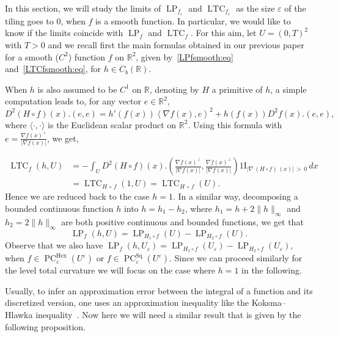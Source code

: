 \documentclass[AHL,Unicode,longabstracts,published]{cedram}
\newcommand{\R}{\mathbb{R}}
\newcommand{\ind}{{1\!\!\mathrm{I}}}
\newcommand{\eps}{\varepsilon}
\DeclareMathOperator{\LTC}{LTC}
\DeclareMathOperator{\LP}{LP}
\DeclareMathOperator{\PC}{PC}
\DeclareMathOperator{\Hex}{Hex}
\DeclareMathOperator{\Sq}{Sq}
\begin{document}
In this section, we will study the limits of $\LP_{f_\eps}$ and $\LTC_{f_\eps}$ as the size $\eps$ of the tiling goes to $0$, when $f$ is a smooth function. In particular, we would like to know if the limits coincide with $\LP_f$ and $\LTC_f$. For this aim, let $U=(0,T)^2$ with $T>0$ and we recall first the main formulas obtained in our previous paper~\cite{BD-Geometry-published} for a smooth ($C^2$) function $f$ on $\R^2$, given by~\eqref{LPfsmooth:eq} and~\eqref{LTCfsmooth:eq}, for $h\in C_b(\R)$.


When $h$ is also assumed to be $C^1$ on $\R$, denoting by $H$ a primitive of $h$, a simple computation leads to, for any vector $e\in\R^2$, 
\[
D^2(H\circ f)(x).(e,e) = h'(f(x))\left\langle \nabla f(x),e\right\rangle^2 +
h(f(x)) D^2 f(x).(e,e),
\]
where $\langle \cdot,\cdot\rangle$ is the Euclidean scalar product on $\R^2$. Using this formula with $e=\tfrac{\nabla f(x)^\perp}{|\nabla f(x)|} $, we get, 

\begin{align*}
\LTC_f (h,U) & = - \int_U D^2(H\circ f)(x).\left(\frac{\nabla f(x)^\perp}{\left|\nabla f(x)\right|}, \frac{\nabla f(x)^\perp}{\left|\nabla f(x)\right|} \right) \ind_{\left|\nabla\,(H\circ f)\,(x)\right|\,>\,0} \, dx \\
&= \LTC_{H\,\circ\,f} (1,U) = \LTC_{H\,\circ\,f} (U).
\end{align*}
Hence we are reduced back to the case $h=1$. In a similar way, decomposing a bounded continuous function $h$ into $h=h_1-h_2$, where $h_1=h +2 \|h\|_\infty$ and $h_2=2 \| h\|_\infty$ are both positive continuous and bounded functions, we get that
\[
\LP_f (h,U) = \LP_{H_1\circ f} (U)-\LP_{H_2\circ f} (U).
\]
Observe that we also have $\LP_f (h,U_\eps) = \LP_{H_1\circ f} (U_\eps)-\LP_{H_2\circ f} (U_\eps),$ when $f\in\PC^{\Hex}_\eps(U^{\eps})$ or $f\in \PC^{\Sq}_\eps(U^{\eps})$. Since we can proceed similarly for the level total curvature we will focus on the case where $h=1$ in the following.

%
%

Usually, to infer an approximation error between the integral of a function and its discretized version, one uses an approximation inequality like the Koksma--Hlawka inequality~\cite{PausingerSvane2015}. Now here we will need a similar result that is given by the following proposition.
\end{document}
